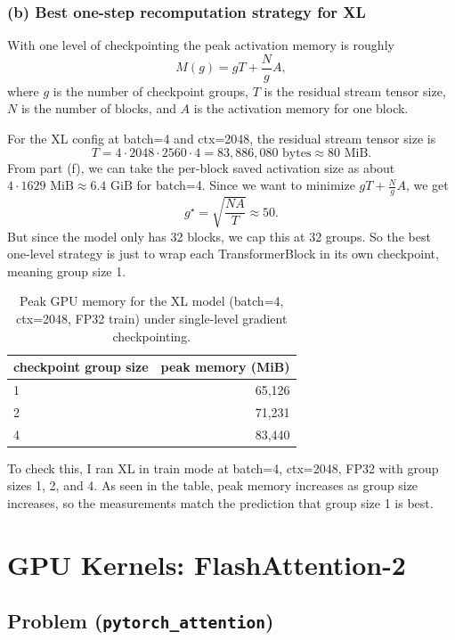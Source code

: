 \documentclass[11pt]{article}
\begin{document}
\subsubsection*{(b) Best one-step recomputation strategy for XL}

With one level of checkpointing the peak activation memory is roughly
\[
    M(g) = gT + \frac{N}{g} A,
\]
where $g$ is the number of checkpoint groups, $T$ is the residual stream tensor size, $N$ is the number of blocks, and $A$ is the activation memory for one block.

For the XL config at batch=4 and ctx=2048, the residual stream tensor size is
\[
    T = 4 \cdot 2048 \cdot 2560 \cdot 4
      = 83{,}886{,}080\text{ bytes}
      \approx 80\text{ MiB}.
\]
From part (f), we can take the per-block saved activation size as about $4 \cdot 1629\text{ MiB} \approx 6.4\text{ GiB}$ for batch=4. Since we want to minimize $gT + \frac{N}{g}A$, we get
\[
    g^\star = \sqrt{\frac{NA}{T}} \approx 50.
\]
But since the model only has 32 blocks, we cap this at 32 groups. So the best one-level strategy is just to wrap each TransformerBlock in its own checkpoint, meaning group size 1.

\begin{table}[H]
\centering
\caption{Peak GPU memory for the XL model (batch=4, ctx=2048, FP32 train) under single-level gradient checkpointing.}
\begin{tabular}{lr}
\toprule
checkpoint group size & peak memory (MiB) \\
\midrule
1 & 65{,}126 \\
2 & 71{,}231 \\
4 & 83{,}440 \\
\bottomrule
\end{tabular}
\end{table}

To check this, I ran XL in train mode at batch=4, ctx=2048, FP32 with group sizes 1, 2, and 4. As seen in the table, peak memory increases as group size increases, so the measurements match the prediction that group size 1 is best.

\newpage


\section{GPU Kernels: FlashAttention-2}


\subsection{Problem (\texttt{pytorch\_attention})}
\end{document}
